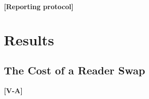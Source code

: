 \documentclass[letterpaper, 10 pt, conference]{ieeeconf}
\newcommand{\todo}[1]{\textbf{[#1]}}
\begin{document}
\todo{Reporting protocol}

\section{Results}
\label{sec:results}

\subsection{The Cost of a Reader Swap}
\label{sec:results:key}
\todo{V-A}
\end{document}

